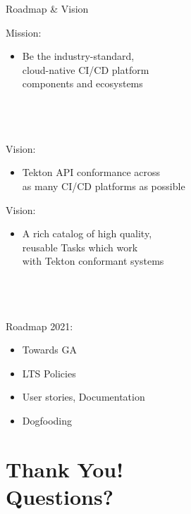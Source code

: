 \documentclass[aspectratio=169,11pt,hyperref={colorlinks=true}]{beamer}
\begin{document}
\begin{2columnsframe}{Roadmap \& Vision}%
  {%
  Mission:
  \begin{itemize}
    \item Be the industry-standard,\\
          cloud-native CI/CD platform \\
          components and ecosystems \\
  \end{itemize}
  ~\\
  ~\\
  \tiny~\\
  \normalsize
  Vision:
  \begin{itemize}
    \item Tekton API conformance across\\
          as many CI/CD platforms as possible
  \end{itemize}
  }{%
  Vision:
  \begin{itemize}
    \item A rich catalog of high quality,\\
          reusable Tasks which work\\
          with Tekton conformant systems\\
  \end{itemize}
  ~\\
  ~\\
  \tiny~\\
  \normalsize
  Roadmap 2021:
  \begin{itemize}
    \item Towards GA
    \item LTS Policies
    \item User stories, Documentation
    \item Dogfooding
  \end{itemize}
  }
\end{2columnsframe}


\section[Q\&A]{Thank You! \\Questions?}
\end{document}
